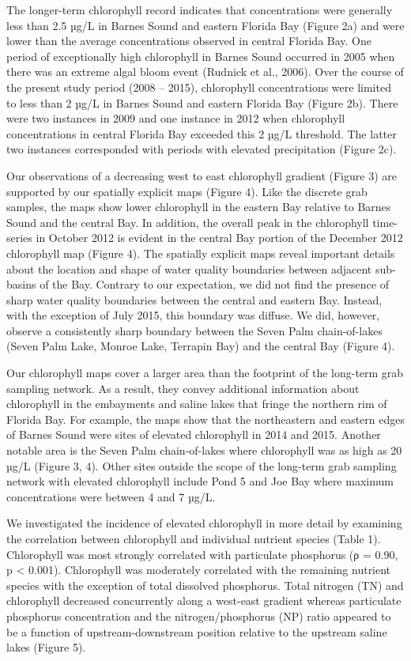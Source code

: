 The longer-term chlorophyll record indicates that concentrations were generally less than 2.5 µg/L in Barnes Sound and eastern Florida Bay (Figure 2a) and were lower than the average concentrations observed in central Florida Bay. One period of exceptionally high chlorophyll in Barnes Sound occurred in 2005 when there was an extreme algal bloom event (Rudnick et al., 2006). Over the course of the present study period (2008 – 2015), chlorophyll concentrations were limited to less than 2 µg/L in Barnes Sound and eastern Florida Bay (Figure 2b). There were two instances in 2009 and one instance in 2012 when chlorophyll concentrations in central Florida Bay exceeded this 2 µg/L threshold. The latter two instances corresponded with periods with elevated precipitation (Figure 2c).  

Our observations of a decreasing west to east chlorophyll gradient (Figure 3) are supported by our spatially explicit maps (Figure 4). Like the discrete grab samples, the maps show lower chlorophyll in the eastern Bay relative to Barnes Sound and the central Bay. In addition, the overall peak in the chlorophyll time-series in October 2012 is evident in the central Bay portion of the December 2012 chlorophyll map (Figure 4). The spatially explicit maps reveal important details about the location and shape of water quality boundaries between adjacent sub-basins of the Bay. Contrary to our expectation, we did not find the presence of sharp water quality boundaries between the central and eastern Bay. Instead, with the exception of July 2015, this boundary was diffuse. We did, however, observe a consistently sharp boundary between the Seven Palm chain-of-lakes (Seven Palm Lake, Monroe Lake, Terrapin Bay) and the central Bay (Figure 4). 

Our chlorophyll maps cover a larger area than the footprint of the long-term grab sampling network. As a result, they convey additional information about chlorophyll in the embayments and saline lakes that fringe the northern rim of Florida Bay. For example, the maps show that the northeastern and eastern edges of Barnes Sound were sites of elevated chlorophyll in 2014 and 2015. Another notable area is the Seven Palm chain-of-lakes where chlorophyll was as high as 20 µg/L (Figure 3, 4). Other sites outside the scope of the long-term grab sampling network with elevated chlorophyll include Pond 5 and Joe Bay where maximum concentrations were between 4 and 7 µg/L. 

We investigated the incidence of elevated chlorophyll in more detail by examining the correlation between chlorophyll and individual nutrient species (Table 1). Chlorophyll was most strongly correlated with particulate phosphorus (ρ = 0.90, p < 0.001). Chlorophyll was moderately correlated with the remaining nutrient species with the exception of total dissolved phosphorus. Total nitrogen (TN) and chlorophyll decreased concurrently along a west-east gradient whereas particulate phosphorus concentration and the nitrogen/phosphorus (NP) ratio appeared to be a function of upstream-downstream position relative to the upstream saline lakes (Figure 5).  

